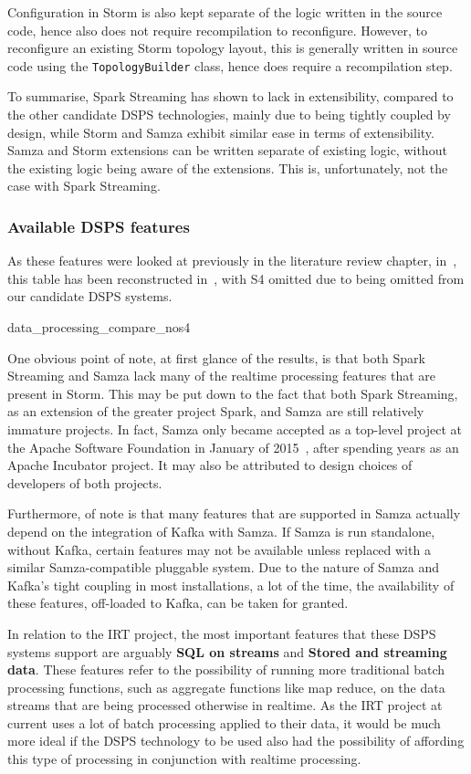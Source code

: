 Configuration in Storm is also kept separate of the logic written in the source code, hence also does not require recompilation
to reconfigure. However, to reconfigure an existing Storm topology layout, this is generally written in source code using
the \texttt{TopologyBuilder} class, hence does require a recompilation step.

To summarise, Spark Streaming has shown to lack in extensibility, compared to the other candidate DSPS technologies, mainly
due to being tightly coupled by design, while Storm and Samza exhibit similar ease in terms of extensibility. Samza and
Storm extensions can be written separate of existing logic, without the existing logic being aware of the extensions.
This is, unfortunately, not the case with Spark Streaming.


\subsubsection{Available DSPS features}

As these features were looked at previously in the literature review chapter, in~,
this table has been reconstructed in~, with S4 omitted due to being omitted from our candidate
DSPS systems.

{data_processing_compare_nos4}

One obvious point of note, at first glance of the results, is that both Spark Streaming and Samza lack many of the realtime processing
features that are present in Storm. This may be put down to the fact that both Spark Streaming, as an extension
of the greater project Spark, and Samza are still relatively immature projects. In fact, Samza only became accepted as a
top-level project at the Apache Software Foundation in January of 2015~\cite{web:apache-top-samza}, after spending years
as an Apache Incubator project. It may also be attributed to design choices of developers of both projects.

Furthermore, of note is that many features that are supported in Samza actually depend on the integration of Kafka with
Samza. If Samza is run standalone, without Kafka, certain features may not be available unless replaced with a similar
Samza-compatible pluggable system. Due to the nature of Samza and Kafka's tight coupling in most installations, a lot
of the time, the availability of these features, off-loaded to Kafka, can be taken for granted.

In relation to the IRT project, the most important features that these DSPS systems support are arguably \textbf{SQL on
streams} and \textbf{Stored and streaming data}. These features refer to the possibility of running more traditional
batch processing functions, such as aggregate functions like map reduce, on the data streams that are being processed
otherwise in realtime. As the IRT project at current uses a lot of batch processing applied to their data, it would be
much more ideal if the DSPS technology to be used also had the possibility of affording this type of processing in
conjunction with realtime processing.

